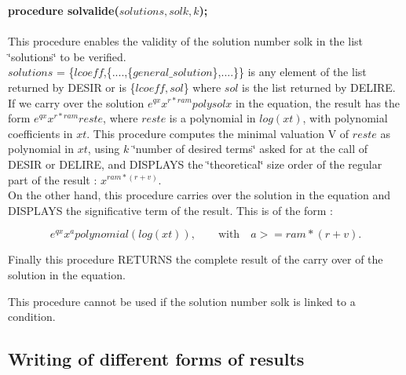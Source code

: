 \documentclass[a4paper]{article}
\begin{document}
{\bf procedure solvalide($solutions,solk,k$);} \\
\ \\
This procedure enables the validity of the solution number solk in the list
\char`\"{}solutions\char`\"{} to be verified. \\
$solutions$ = \{$lcoeff$,\{....,\{$general\_solution$\},....\}\} is any element
of the list returned by DESIR or is \{$lcoeff,sol$\} where $sol$ is the list 
returned by DELIRE. \\

If we carry over the solution $e^{qx} x^{r*ram} polysolx$ in the equation, the
result has the form $e^{qx} x^{r*ram} reste$, where $reste$ is a polynomial in
$log(xt)$, with polynomial coefficients in $xt$. This procedure computes the
minimal valuation V of $reste$ as polynomial in $xt$, using $k$ \char`\"{}number
of desired terms\char`\"{} asked for at the call of DESIR or DELIRE, and DISPLAYS
the \char`\"{}theoretical\char`\"{} size order of the regular part of the result
: $x^{ram*(r+v)}$. \\

On the other hand, this procedure carries over the solution in the equation
and DISPLAYS the significative term of the result. This is of the form :

\[e^{qx} x^a polynomial(log(xt)), \qquad \mbox{with} \quad a>=ram*(r+v).\]

Finally this procedure RETURNS the complete result of the carry over of the
solution in the equation. \par
This procedure cannot be used if the solution number solk is linked to a
condition.

\subsection{Writing of different forms of results}
\end{document}

